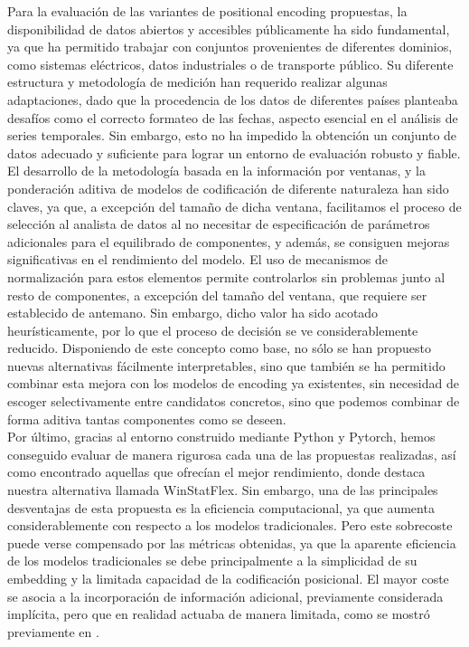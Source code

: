 Para la evaluación de las variantes de positional encoding propuestas, la disponibilidad de datos abiertos y accesibles públicamente ha sido fundamental, ya que ha permitido trabajar con conjuntos provenientes de diferentes dominios, como sistemas eléctricos, datos industriales o de transporte público. Su diferente estructura y metodología de medición han requerido realizar algunas adaptaciones, dado que la procedencia de los datos de diferentes países planteaba desafíos como el correcto formateo de las fechas, aspecto esencial en el análisis de series temporales. Sin embargo, esto no ha impedido la obtención un conjunto de datos adecuado y suficiente para lograr un entorno de evaluación robusto y fiable.\\

El desarrollo de la metodología basada en la información por ventanas, y la ponderación aditiva de modelos de codificación de diferente naturaleza han sido claves, ya que, a excepción del tamaño de dicha ventana, facilitamos el proceso de selección al analista de datos al no necesitar de especificación de parámetros adicionales para el equilibrado de componentes, y además, se consiguen mejoras significativas en el rendimiento del modelo. El uso de mecanismos de normalización para estos elementos permite controlarlos sin problemas junto al resto de componentes, a excepción del tamaño del ventana, que requiere ser establecido de antemano. Sin embargo, dicho valor ha sido acotado heurísticamente, por lo que el proceso de decisión se ve considerablemente reducido.
Disponiendo de este concepto como base, no sólo se han propuesto nuevas alternativas fácilmente interpretables, sino que también se ha permitido combinar esta mejora con los modelos de encoding ya existentes, sin necesidad de escoger selectivamente entre candidatos concretos, sino que podemos combinar de forma aditiva tantas componentes como se deseen.\\

Por último, gracias al entorno construido mediante Python y Pytorch, hemos conseguido evaluar de manera rigurosa cada una de las propuestas realizadas, así como encontrado aquellas que ofrecían el mejor rendimiento, donde destaca nuestra alternativa llamada WinStatFlex. Sin embargo, una de las principales desventajas de esta propuesta es la eficiencia computacional, ya que aumenta considerablemente con respecto a los modelos tradicionales. Pero este sobrecoste puede verse compensado por las métricas obtenidas, ya que la aparente eficiencia de los modelos tradicionales se debe principalmente a la simplicidad de su embedding y la limitada capacidad de la codificación posicional. El mayor coste se asocia a la incorporación de información adicional, previamente considerada implícita, pero que en realidad actuaba de manera limitada, como se mostró previamente en \cite{zeng2022transformerseffectivetimeseries}.

